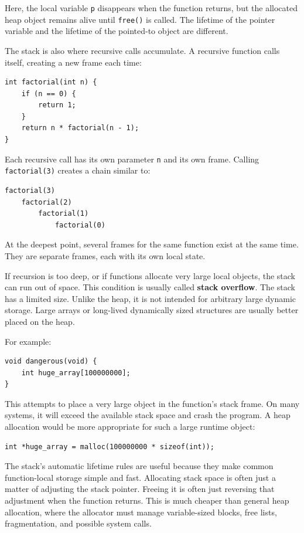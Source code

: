 Here, the local variable \texttt{p} disappears when the function returns, but the allocated heap object remains alive until \texttt{free()} is called. The lifetime of the pointer variable and the lifetime of the pointed-to object are different.

The stack is also where recursive calls accumulate. A recursive function calls itself, creating a new frame each time:

\begin{verbatim}
int factorial(int n) {
    if (n == 0) {
        return 1;
    }
    return n * factorial(n - 1);
}
\end{verbatim}

Each recursive call has its own parameter \texttt{n} and its own frame. Calling \texttt{factorial(3)} creates a chain similar to:

\begin{verbatim}
factorial(3)
    factorial(2)
        factorial(1)
            factorial(0)
\end{verbatim}

At the deepest point, several frames for the same function exist at the same time. They are separate frames, each with its own local state.

If recursion is too deep, or if functions allocate very large local objects, the stack can run out of space. This condition is usually called \textbf{stack overflow}. The stack has a limited size. Unlike the heap, it is not intended for arbitrary large dynamic storage. Large arrays or long-lived dynamically sized structures are usually better placed on the heap.

For example:

\begin{verbatim}
void dangerous(void) {
    int huge_array[100000000];
}
\end{verbatim}

This attempts to place a very large object in the function's stack frame. On many systems, it will exceed the available stack space and crash the program. A heap allocation would be more appropriate for such a large runtime object:

\begin{verbatim}
int *huge_array = malloc(100000000 * sizeof(int));
\end{verbatim}

The stack's automatic lifetime rules are useful because they make common function-local storage simple and fast. Allocating stack space is often just a matter of adjusting the stack pointer. Freeing it is often just reversing that adjustment when the function returns. This is much cheaper than general heap allocation, where the allocator must manage variable-sized blocks, free lists, fragmentation, and possible system calls.

